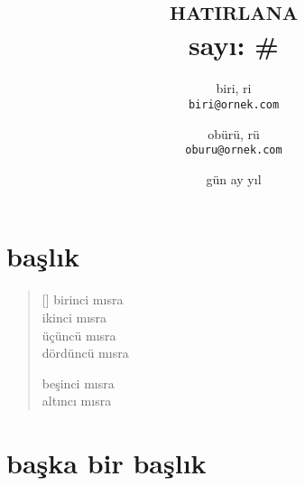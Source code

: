 \documentclass[a4paper, twocolumn]{memoir}
\author{
  biri, ri\\
  \texttt{biri@ornek.com}
  \and
  obürü, rü\\
  \texttt{oburu@ornek.com}
}
\title{\textsc{hatirlana}\\\small sayı: \#}
\date{gün ay yıl}
\begin{document}
\maketitle
\section{başlık}
\lipsum[0-2]
\begin{verse}[\versewidth]
  birinci mısra \\
  ikinci mısra \\
  üçüncü mısra \\
  dördüncü mısra

  beşinci mısra \\
  altıncı mısra
\end{verse}
\section{başka bir başlık}
\lipsum[3-6]
\end{document}
